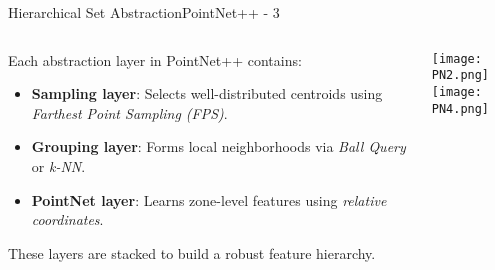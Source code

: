 \documentclass{beamer}
\begin{document}
        
\begin{frame}{Hierarchical Set Abstraction}{PointNet++ - 3}

\begin{columns}[c]

\begin{column}{0.6\textwidth}
\small
Each abstraction layer in PointNet++ contains:
\vspace{0.5em}
\begin{itemize}
    \item \textbf{Sampling layer}: Selects well-distributed centroids using \textit{Farthest Point Sampling (FPS)}.
    \item \textbf{Grouping layer}: Forms local neighborhoods via \textit{Ball Query} or \textit{k-NN}.
    \item \textbf{PointNet layer}: Learns zone-level features using \textit{relative coordinates}.
\end{itemize}
\vspace{1em}
These layers are stacked to build a robust feature hierarchy.
\end{column}

\begin{column}{0.4\textwidth}
    \texttt{[image: PN2.png]} \\
    \vspace{1em}
    \texttt{[image: PN4.png]}
\end{column}

\end{columns}

\end{frame}
\end{document}
